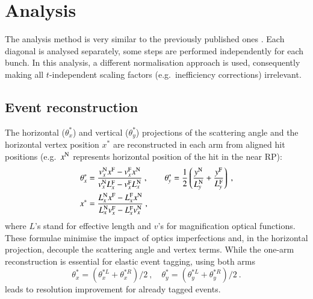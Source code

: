 \section{Analysis}

The analysis method is very similar to the previously published ones \cite{prl111,epl101-el}. Each diagonal is analysed
separately, some steps are performed independently for each bunch. In this analysis, a different normalisation
approach is used, consequently making all $t$-independent scaling factors (e.g.~inefficiency corrections)
irrelevant.

\subsection{Event reconstruction}

The horizontal ($\theta_x^*$) and vertical ($\theta_y^*$) projections of the scattering angle and the horizontal
vertex position $x^*$ are reconstructed in each arm from aligned hit positions (e.g.~$x^{\rm N}$ represents horizontal
position of the hit in the near RP):
\begin{equation}
\label{eq:kin 1a}
	\begin{aligned}
		\theta_x^* &= {v_x^{\rm N} x^{\rm F} - v_x^{\rm F} x^{\rm N}\over v_x^{\rm N} L_x^{\rm F} - v_x^{\rm F} L_x^{\rm N}}\ ,\qquad
		\theta_y^* = {1\over 2} \left( {y^{\rm N}\over L_y^{\rm N}} + {y^{\rm F}\over L_y^{\rm F}} \right)\ ,\\
		x^* &= {L_x^{\rm N} x^{\rm F} - L_x^{\rm F} x^{\rm N}\over L_x^{\rm N} v_x^{\rm F} - L_x^{\rm F} v_x^{\rm N}}\ , \\
	\end{aligned}
\end{equation}
where $L$'s stand for effective length and $v$'s for magnification optical functions. These formulae minimise the
impact of optics imperfections and, in the horizontal projection, decouple the scattering angle and vertex terms.
While the one-arm reconstruction is essential for elastic event tagging, using both arms
\begin{equation}
\label{eq:kin 2a}
\theta_x^* = (\theta_x^{*L} + \theta_x^{*R})/2\ ,\quad \theta_y^* = (\theta_y^{*L} + \theta_y^{*R})/2\ .
\end{equation}
leads to resolution improvement for already tagged events.

